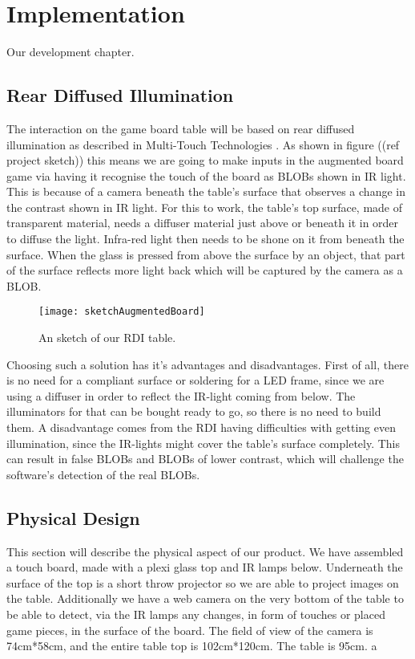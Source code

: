 \chapter{Implementation}\label{ch:implementation}
Our development chapter. 

\section{Rear Diffused Illumination}
The interaction on the game board table will be based on rear diffused illumination as described in Multi-Touch Technologies \citep{multiTT}. As shown in figure ((ref project sketch)) this means we are going to make inputs in the augmented board game via having it recognise the touch of the board as BLOBs shown in IR light. This is because of a camera beneath the table's surface that observes a change in the contrast shown in IR light. 
For this to work, the table's top surface, made of transparent material, needs a diffuser material just above or beneath it in order to diffuse the light. Infra-red light then needs to be shone on it from beneath the surface. When the glass is pressed from above the surface by an object, that part of the surface reflects more light back which will be captured by the camera as a BLOB.
\begin{figure}[!h]
\centering	\texttt{[image: sketchAugmentedBoard]}
\label{Figure 5.1} \caption{An sketch of our RDI table.}
\end{figure}

Choosing such a solution has it's advantages and disadvantages. First of all, there is no need for a compliant surface or soldering for a LED frame, since we are using a diffuser in order to reflect the IR-light coming from below. The illuminators for that can be bought ready to go, so there is no need to build them. A disadvantage comes from the RDI having difficulties with getting even illumination, since the IR-lights might cover the table's surface completely. This can result in false BLOBs and BLOBs of lower contrast, which will challenge the software's detection of the real BLOBs.

\section{Physical Design} 
This section will describe the physical aspect of our product.
We have assembled a touch board, made with a plexi glass top and IR lamps below. Underneath the surface of the top is a short throw projector so we are able to project images on the table. Additionally we have a web camera on the very bottom of the table to be able to detect, via the IR lamps any changes, in form of touches or placed game pieces, in the surface of the board. 
The field of view of the camera is 74cm*58cm, and the entire table top is 102cm*120cm. The table is 95cm. 
a

